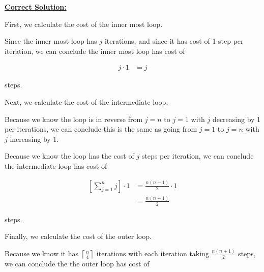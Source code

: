 \documentclass[12pt]{article}
\begin{document}
\begin{enumerate}[a.]
    \begin{mdframed}
        \underline{\textbf{Correct Solution:}}

        \bigskip

        \color{red}
        First, we calculate the cost of the inner most loop.
        \color{black}

        \bigskip

        Since the inner most loop has $j$ iterations, and since it has cost of 1 step per
        iteration, we can conclude the inner most loop has cost of

        \setcounter{equation}{0}
        \begin{align}
            j \cdot 1 &= j
        \end{align}

        steps.

        \bigskip

        \color{red}
        Next, we calculate the cost of the intermediate loop.
        \color{black}

        \bigskip

        \color{red}
        Because we know the loop is in reverse from $j = n$ to $j = 1$ with $j$
        decreasing by 1 per iterations, we can conclude this is the same as going
        from $j = 1$ to $j = n$ with $j$ increasing by 1.

        \color{black}

        \bigskip

        Because we know the loop has the cost of $j$ steps per iteration,
        we can conclude the intermediate loop has cost of

        \color{red}
        \begin{align}
            \left[ \sum\limits_{j=1}^{n} j \right] \cdot 1 &= \frac{n(n+1)}{2} \cdot 1\\
            &= \frac{n(n+1)}{2}
        \end{align}
        \color{black}

        steps.

        \bigskip

        \color{red}
        Finally, we calculate the cost of the outer loop.
        \color{black}

        \bigskip

        Because we know it has $\left\lceil \frac{n}{4} \right\rceil$ iterations
        with each iteration taking \color{red}$\frac{n(n+1)}{2}$\color{black} steps,
        we can conclude the the outer loop has cost of


\end{mdframed}
\end{enumerate}
\end{document}
